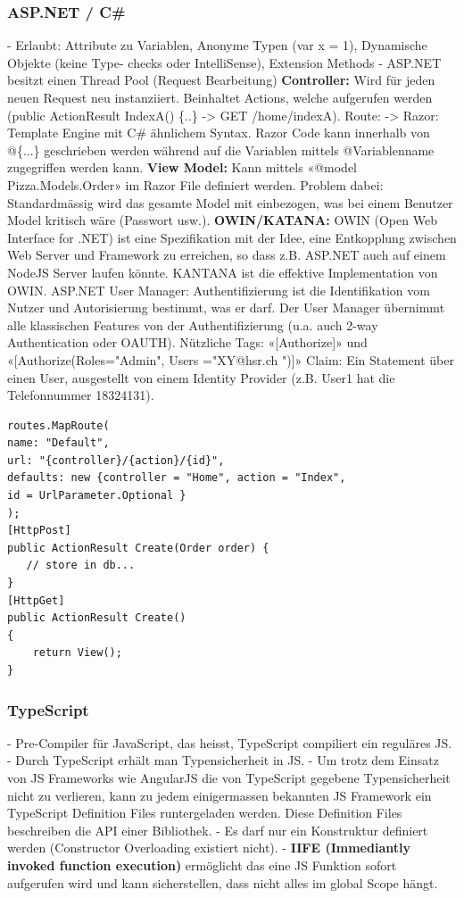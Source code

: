 \begin{multicols*}{4}
\subsubsection{ASP.NET / C\#}
- Erlaubt: Attribute zu Variablen, Anonyme Typen (var x = 1), Dynamische Objekte (keine Type- checks oder 
IntelliSense), Extension Methods
- ASP.NET besitzt einen Thread Pool (Request Bearbeitung)
\textbf{\color{RedOrange}Controller:} Wird für jeden neuen Request neu instanziiert. Beinhaltet Actions, 
welche aufgerufen werden (public ActionResult IndexA() \{..\} -> GET /home/indexA).
Route: ->
Razor: Template Engine mit C\# ähnlichem Syntax.
Razor Code kann innerhalb von
@\{...\} geschrieben
werden während
auf die Variablen
mittels @Variablenname
zugegriffen werden kann.
\textbf{\color{RedOrange}View Model:} Kann mittels «@model Pizza.Models.Order» im
 Razor File definiert werden. Problem dabei: 
Standardmässig wird das gesamte Model mit einbezogen, 
was bei einem Benutzer Model kritisch wäre (Passwort usw.).
\textbf{\color{RedOrange}OWIN/KATANA:} OWIN (Open Web Interface for .NET) ist eine 
Spezifikation mit der Idee, eine Entkopplung zwischen Web Server und 
Framework zu erreichen, so dass z.B. ASP.NET auch auf einem NodeJS Server laufen könnte. 
KANTANA ist die effektive Implementation von OWIN. ASP.NET User Manager: 
Authentifizierung ist die Identifikation vom Nutzer und Autorisierung bestimmt,
 was er darf. Der User Manager übernimmt alle klassischen Features von der Authentifizierung 
 (u.a. auch 2-way Authentication oder OAUTH). Nützliche Tags: «[Authorize]» und 
 «[Authorize(Roles="Admin", Users ="XY@hsr.ch ")]»
Claim: Ein Statement über einen User, ausgestellt von einem Identity 
Provider (z.B. User1 hat die Telefonnummer 18324131).
\begin{verbatim}
routes.MapRoute(
name: "Default",
url: "{controller}/{action}/{id}",
defaults: new {controller = "Home", action = "Index", 
id = UrlParameter.Optional }
);
[HttpPost]
public ActionResult Create(Order order) {
   // store in db...
}
[HttpGet]
public ActionResult Create()
{
    return View();
}
\end{verbatim}

\subsubsection{TypeScript}
- Pre-Compiler für JavaScript, das heisst, TypeScript compiliert ein reguläres JS.
- Durch TypeScript erhält man Typensicherheit in JS.
- Um trotz dem Einsatz von JS Frameworks wie AngularJS die von TypeScript gegebene Typensicherheit 
nicht zu verlieren, kann zu jedem einigermassen bekannten JS Framework ein 
TypeScript Definition Files runtergeladen werden. Diese Definition Files beschreiben die API einer Bibliothek.
- Es darf nur ein Konstruktur definiert werden (Constructor Overloading existiert nicht).
- \textbf{IIFE (Immediantly invoked function execution)} ermöglicht das eine JS Funktion sofort aufgerufen
wird und kann sicherstellen, dass nicht alles im global Scope hängt.


\end{multicols*}
